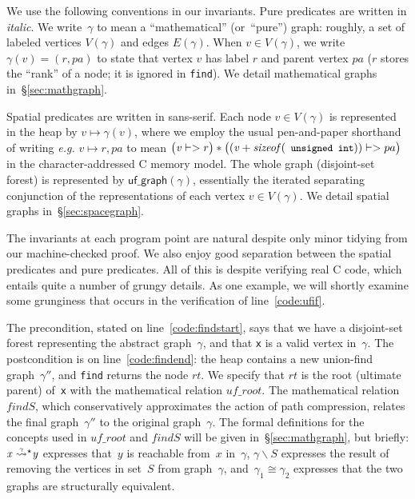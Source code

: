 \documentclass[acmsmall,screen]{acmart}
\newcommand{\li}[1]{{\texttt{\small #1}}}
\newcommand{\reachable}[5]{\ensuremath{{\m{#1}\;\accentset{#2}{\leadsto}^{#3}_{#4} \m{#5}}}}
\newcommand{\p}[1]{\ensuremath{\mathsf{#1}}} \newcommand{\m}[1]{\ensuremath{\mathit{#1}}} \newcommand{\ma}[1]{\ensuremath{\mathcal{#1}}} \let\ramify\lightning
\begin{document}
We use the following conventions in our invariants.  Pure predicates are written in
\textit{italic}.  We write~$\gamma$ to
mean a ``mathematical'' (or~``pure'') graph: roughly, a set of
labeled vertices $V(\gamma)$ and edges $E(\gamma)$.
When $\m{v} \in V(\gamma)$, we write $\gamma(\m{v}) = (r,pa)$ to state that vertex $\m{v}$ has
label $r$ and parent vertex $pa$ ($r$ stores the ``rank'' of a node; it is ignored
in \li{find}).  We detail mathematical graphs in~\S\ref{sec:mathgraph}.

Spatial predicates are written in \textsf{sans-serif}.
Each node $\m{v} \in V(\gamma)$ is
represented in the heap by $\m{v} \mapsto \gamma(\m{v})$, where we employ the usual pen-and-paper
shorthand of writing \emph{e.g.} $\m{v} \mapsto r,pa$ to mean
\mbox{$\big(\m{v} |-> r\big) * \big((\m{v} + \m{sizeof}(\li{unsigned int})) |-> pa\big)$} in the character-addressed C memory model.
The whole graph (disjoint-set forest) is represented by
$\p{uf\_graph}(\gamma)$, essentially the
iterated separating conjunction of the representations
of each vertex $\m{v} \in V(\gamma)$.
We detail spatial graphs in~\S\ref{sec:spacegraph}.

The invariants at
each program point are natural despite only minor tidying from our machine-checked
proof.  We also enjoy good separation between the spatial predicates and pure
predicates.  All of this is despite verifying real C code, which entails quite a number
of grungy details. As one example, we will shortly 
examine some grunginess that occurs in the
verification of line~\ref{code:ufif}.

The precondition, stated on line~\ref{code:findstart}, says that we have a disjoint-set forest representing the abstract graph~$\gamma$, and that \li{x} is a valid vertex in~$\gamma$.  The postcondition is on line~\ref{code:findend}: the heap contains a new union-find graph~$\gamma''$, and \li{find} returns the node \m{rt}.
We specify that $\m{rt}$
is the root (ultimate parent) of~\li{x} with the mathematical relation $\m{uf\_root}$.
The mathematical relation $\m{findS}$, which conservatively approximates the action of path
compression, relates the final graph~$\gamma''$ to the original graph~$\gamma$.
The formal definitions for the concepts used in $\m{uf\_root}$ and $\m{findS}$
will be given in~\S\ref{sec:mathgraph}, but briefly:
$\reachable{x}{\gamma}{\star}{}{y}$ expresses that~$y$ is reachable
from~$x$ in~$\gamma$, $\gamma \smallsetminus S$ expresses the result of removing the
vertices in set~$S$ from graph~$\gamma$, and~$\gamma_1 \cong \gamma_2$ expresses that the two
graphs are structurally equivalent.
\end{document}
